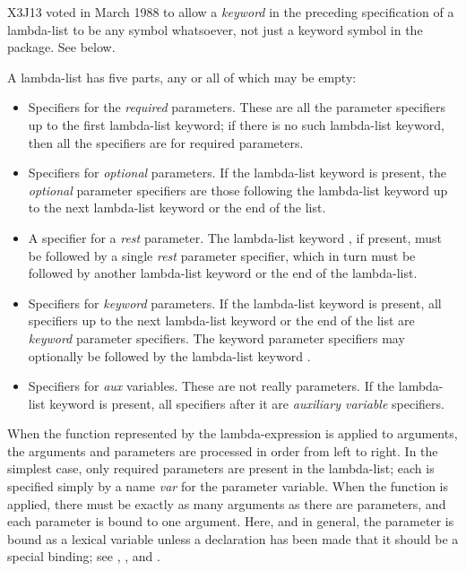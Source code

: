 \begin{newer}
X3J13 voted in March 1988 
to allow a {\it keyword} in the preceding specification of a lambda-list
to be any symbol whatsoever, not just a keyword symbol
in the  package.  See below.
\end{newer}

A lambda-list has five parts, any or all of which may be empty:
\begin{itemize}
\item
Specifiers for the {\it required} parameters.  These are all the parameter
specifiers up to the first lambda-list keyword; if there is no such
lambda-list keyword, then all the specifiers are for required parameters.

\item
Specifiers for {\it optional} parameters.
If the lambda-list keyword  is present,
the {\it optional} parameter specifiers are those following the
lambda-list keyword  up to the next lambda-list keyword or the end of the list.

\item
A specifier for a {\it rest} parameter.  The lambda-list keyword , if present, must
be followed by a single {\it rest} parameter specifier,
which in turn must be followed by another lambda-list keyword or the end
of the lambda-list.

\item
Specifiers for {\it keyword} parameters.
If the lambda-list keyword  is present, all specifiers up to the next lambda-list keyword
or the end of the list are {\it keyword} parameter specifiers.
The keyword parameter specifiers may optionally be followed by the
lambda-list keyword .

\item
Specifiers for {\it aux} variables.  These are not really parameters.
If the lambda-list keyword  is present, all specifiers after it are
{\it auxiliary variable} specifiers.
\end{itemize}

When the function represented by the lambda-expression is applied
to arguments, the arguments and parameters are processed in order
from left to right.
In the simplest case, only required parameters are present
in the lambda-list; each is specified simply by a name {\it var} for
the parameter variable.
When the function is applied,
there must be exactly as many arguments as there are parameters,
and each parameter is bound to one argument.  Here, and in general,
the parameter is bound as a lexical variable unless a
declaration has been made that it should be a special binding;
see , , and .

